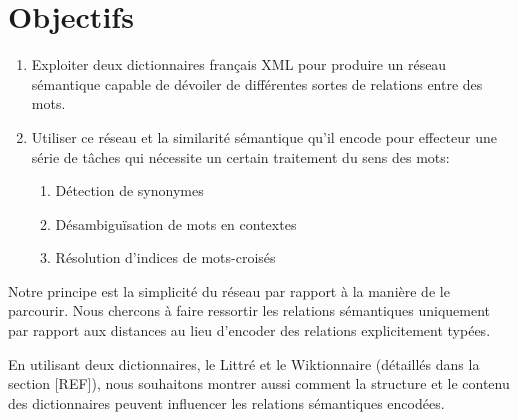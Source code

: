 
\section{Objectifs}

\begin{enumerate}

\item{Exploiter deux dictionnaires français XML pour produire un réseau sémantique capable de dévoiler de différentes sortes de relations entre des mots.}

\item{Utiliser ce réseau et la similarité sémantique qu'il encode pour effecteur une série de tâches qui nécessite un certain traitement du sens des mots:}

    \begin{enumerate}
    \item{Détection de synonymes}
    \item{Désambiguïsation de mots en contextes}
    \item{Résolution d'indices de mots-croisés}
    \end{enumerate}

\end{enumerate}

Notre principe est la simplicité du réseau par rapport à la manière de le parcourir. Nous chercons à faire ressortir les relations sémantiques uniquement par rapport aux distances au lieu d'encoder des relations explicitement typées.

En utilisant deux dictionnaires, le Littré et le Wiktionnaire (détaillés dans la section [REF]), nous souhaitons montrer aussi comment la structure et le contenu des dictionnaires peuvent influencer les relations sémantiques encodées.
